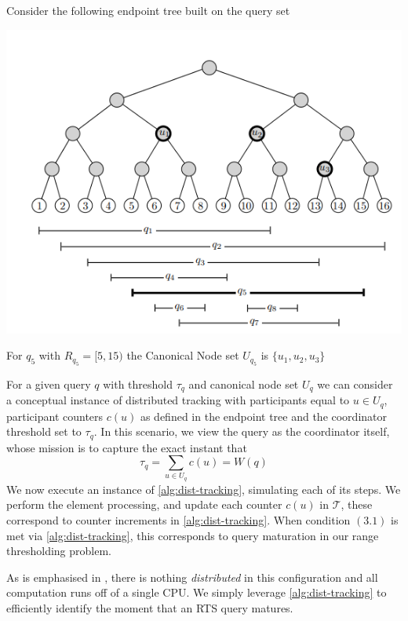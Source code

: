 \begin{example}
    Consider the following endpoint tree built on the query set
    \begin{center}
        \includegraphics[scale=0.7]{thesis/figures/endpoint_tree.png}
    \end{center}
    For $q_5$ with $R_{q_5} = [5, 15)$ the Canonical Node set $U_{q_5}$ is $\{u_1, u_2, u_3\}$
\end{example}

For a given query $q$ with threshold $\tau_q$ and canonical node set $U_q$ we can consider a conceptual instance of distributed tracking with participants equal to $u\in U_q$, participant counters $c(u)$ as defined in the endpoint tree and the coordinator threshold set to $\tau_q$. In this scenario, we view the query as the coordinator itself, whose mission is to capture the exact instant that 
\begin{equation}
    \tau_q = \sum_{u \in U_q} c(u) = W(q)
\end{equation}
We now execute an instance of \cref{alg:dist-tracking}, simulating each of its steps. We perform the element processing, and update each counter $c(u)$ in $\mathcal{T}$, these correspond to counter increments in \cref{alg:dist-tracking}. When condition $(3.1)$ is met via \cref{alg:dist-tracking}, this corresponds to query maturation in our range thresholding problem. 

As is emphasised in \cite{GAN16}, there is nothing \textit{distributed} in this configuration and all computation runs off of a single CPU. We simply leverage \cref{alg:dist-tracking} to efficiently identify the moment that an RTS query matures. 

